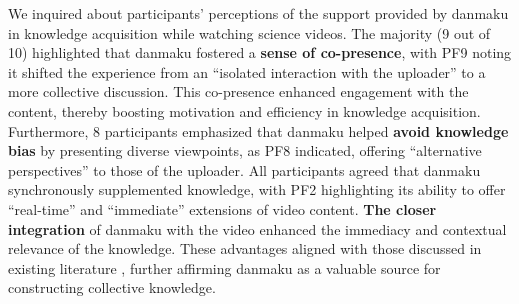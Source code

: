 We inquired about participants' perceptions of the support provided by danmaku in knowledge acquisition while watching science videos. 
The majority (9 out of 10) highlighted that danmaku fostered a \textbf{sense of co-presence}, with PF9 noting it shifted the experience from an ``isolated interaction with the uploader'' to a more collective discussion.
This co-presence enhanced engagement with the content, thereby boosting motivation and efficiency in knowledge acquisition.
Furthermore, 8 participants emphasized that danmaku helped \textbf{avoid knowledge bias} by presenting diverse viewpoints, as PF8 indicated, offering ``alternative perspectives'' to those of the uploader.
All participants agreed that danmaku synchronously supplemented knowledge, with PF2 highlighting its ability to offer ``real-time'' and ``immediate'' extensions of video content.
\textbf{The closer integration} of danmaku with the video enhanced the immediacy and contextual relevance of the knowledge.
These advantages aligned with those discussed in existing literature \cite{he2021beyond, yao2017understanding, chen2015understanding, ma2014analysis, huang2024sharing}, further affirming danmaku as a valuable source for constructing collective knowledge.



